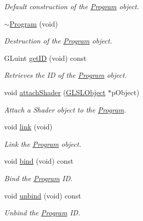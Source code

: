 \begin{DoxyCompactItemize}
\begin{DoxyCompactList}\small\item\em Default construction of the \hyperlink{classsparky_1_1_program}{Program} object. \end{DoxyCompactList}\item 
\hyperlink{classsparky_1_1_program_ae743c5b397c87b9391f465e827c20ef9}{$\sim$\+Program} (void)
\begin{DoxyCompactList}\small\item\em Destruction of the \hyperlink{classsparky_1_1_program}{Program} object. \end{DoxyCompactList}\item 
G\+Luint \hyperlink{classsparky_1_1_program_a111730e41b76cdbf53b37463dd1d5530}{get\+ID} (void) const 
\begin{DoxyCompactList}\small\item\em Retrieves the ID of the \hyperlink{classsparky_1_1_program}{Program} object. \end{DoxyCompactList}\item 
void \hyperlink{classsparky_1_1_program_ac60e7883dc4076f78c3bcc1d5519f7e7}{attach\+Shader} (\hyperlink{classsparky_1_1_g_l_s_l_object}{G\+L\+S\+L\+Object} $\ast$p\+Object)
\begin{DoxyCompactList}\small\item\em Attach a Shader object to the \hyperlink{classsparky_1_1_program}{Program}. \end{DoxyCompactList}\item 
void \hyperlink{classsparky_1_1_program_a7cbc014919fdcca3889edb283fbd4115}{link} (void)
\begin{DoxyCompactList}\small\item\em Link the \hyperlink{classsparky_1_1_program}{Program} object. \end{DoxyCompactList}\item 
void \hyperlink{classsparky_1_1_program_aa61c56e5215ec1cce8d6f7003d883f78}{bind} (void) const 
\begin{DoxyCompactList}\small\item\em Bind the \hyperlink{classsparky_1_1_program}{Program} ID. \end{DoxyCompactList}\item 
void \hyperlink{classsparky_1_1_program_a7682674da3980b52cd2dc0ea0261b867}{unbind} (void) const 
\begin{DoxyCompactList}\small\item\em Unbind the \hyperlink{classsparky_1_1_program}{Program} ID. \end{DoxyCompactList}\end{DoxyCompactItemize}


